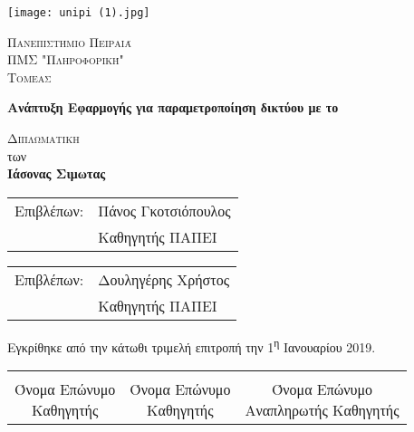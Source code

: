            \begin{center}
	
	       \vspace*{-1cm}

    \texttt{[image: unipi (1).jpg]}
        
    \Large
    \textsc{Πανεπιστήμιο Πειραιά}\\
    \large
    \textsc{ΠΜΣ "Πληροφορική" }\\
    \textsc{Τομεας}
    
    \vspace{1.5cm}
	
	\Huge
    \textbf{Ανάπτυξη Εφαρμογής για παραμετροποίηση δικτύου με το }
        
    \vspace{1.5cm}
    \Large
    \textsc{Διπλωματικη }\\
    των\\

    \LARGE
    \textbf{Ιάσονας Σιμωτας}
    
    \vfill
    \end{center}
    
    \begin{tabular}{ll}
		Επιβλέπων: & Πάνος Γκοτσιόπουλος \\
		 & Καθηγητής ΠΑΠΕΙ
	\end{tabular}

    \begin{tabular}{ll}
		Επιβλέπων: & Δουληγέρης Χρήστος \\
		 & Καθηγητής ΠΑΠΕΙ
	\end{tabular}
	
	\vspace{1.5cm}
    
    Εγκρίθηκε από την κάτωθι τριμελή επιτροπή την 1\textsuperscript{η} Ιανουαρίου 2019.
    
    \vspace{1.5cm}
	
	\begin{center}
	\noindent\begin{tabular}{ccc}
		\makebox[0.3\textwidth]{\hrulefill} & 
		\makebox[0.3\textwidth]{\hrulefill} & 
		\makebox[0.3\textwidth]{\hrulefill} \\

		\specialcell{Όνομα Επώνυμο \\ Καθηγητής} & 
		\specialcell{Όνομα Επώνυμο \\ Καθηγητής} & 
		\specialcell{Όνομα Επώνυμο \\ Αναπληρωτής Καθηγητής} \\ [8ex]%
	\end{tabular}
	\end{center}